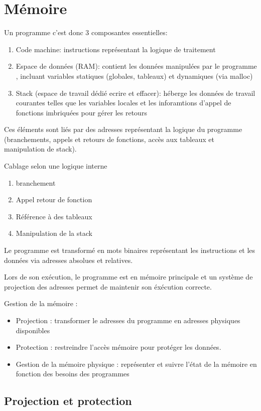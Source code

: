 \section{Mémoire}\label{sec:memoire}
Un programme c'est donc 3 composantes essentielles:
\begin{enumerate}
    \item Code machine: instructions représentant la logique de traitement
    \item Espace de données (RAM): contient les données manipulées par le programme , incluant variables statiques (globales, tableaux) et dynamiques (via malloc)
    \item Stack (espace de travail dédié ecrire et effacer): héberge les données de travail courantes telles que les variables locales et les inforamtions d'appel de fonctions imbriquées pour gérer les retours
\end{enumerate}
Ces éléments sont liés par des adresses représentant la logique du programme (branchements, appels et retours de fonctions, accès aux tableaux et manipulation de stack).

Cablage selon une logique interne
\begin{enumerate}
    \item branchement
    \item Appel retour de fonction
    \item Référence à des tableaux
    \item Manipulation de la stack
\end{enumerate}

Le programme est transformé en mots binaires représentant les instructions et les données via adresses absolues et relatives.

Lors de son exécution, le programme est en mémoire principale et un système de projection des adresses permet de maintenir son éxécution correcte.

Gestion de la mémoire :
\begin{itemize}
    \item Projection : transformer le adresses du programme en adresses physiques disponibles
    \item Protection : restreindre l'accès mémoire pour protéger les données.
    \item Gestion de la mémoire physique : représenter et suivre l'état de la mémoire en fonction des besoins des programmes
\end{itemize}

\subsection{Projection et protection}
